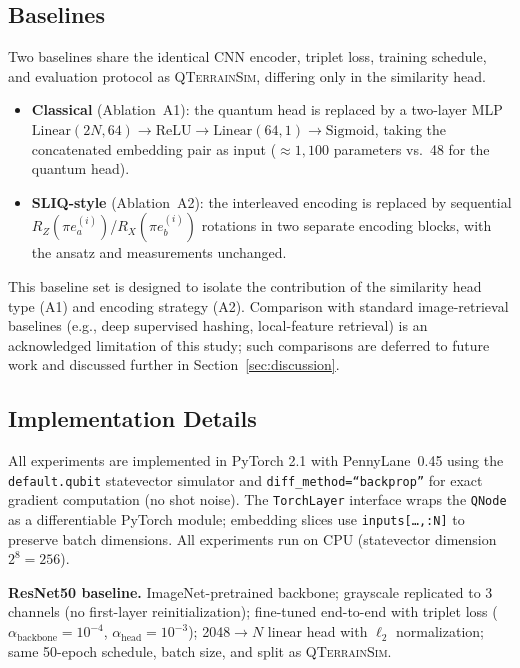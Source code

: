 \documentclass[conference,a4paper]{IEEEtran}
\newcommand{\qts}{\textsc{QTerrainSim}}
\newcommand{\RX}{R_X}
\newcommand{\RZ}{R_Z}
\begin{document}
\subsection{Baselines}
\label{sec:baselines}

Two baselines share the identical CNN encoder, triplet loss, training
schedule, and evaluation protocol as \qts{}, differing only in the
similarity head.

\begin{itemize}
\item \textbf{Classical} (Ablation~A1): the quantum head is replaced by
      a two-layer MLP
      $\mathrm{Linear}(2N,64)\to\mathrm{ReLU}\to\mathrm{Linear}(64,1)\to\mathrm{Sigmoid}$,
      taking the concatenated embedding pair as input
      (${\approx}1{,}100$ parameters vs.\ 48 for the quantum head).
\item \textbf{SLIQ-style} (Ablation~A2): the interleaved encoding is
      replaced by sequential $\RZ(\pi e_a^{(i)})$/$\RX(\pi e_b^{(i)})$
      rotations in two separate encoding blocks, with the ansatz and
      measurements unchanged.
\end{itemize}

This baseline set is designed to isolate the contribution of the
similarity head type (A1) and encoding strategy (A2).
Comparison with standard image-retrieval baselines (e.g., deep
supervised hashing, local-feature retrieval) is an acknowledged
limitation of this study; such comparisons are deferred to future work
and discussed further in Section~\ref{sec:discussion}.

\subsection{Implementation Details}
\label{sec:impl}

All experiments are implemented in PyTorch 2.1 with PennyLane~0.45
\cite{bergholm2018pennylane} using the \texttt{default.qubit} statevector
simulator and \texttt{diff\_method=``backprop''} for exact gradient
computation (no shot noise).
The \texttt{TorchLayer} interface wraps the \texttt{QNode} as a
differentiable PyTorch module; embedding slices use
\texttt{inputs[\ldots,:N]} to preserve batch dimensions.
All experiments run on CPU (statevector dimension $2^8{=}256$).

\textbf{ResNet50 baseline.}
ImageNet-pretrained backbone; grayscale replicated to 3 channels
(no first-layer reinitialization); fine-tuned end-to-end with triplet loss
($\alpha_{\text{backbone}}{=}10^{-4}$, $\alpha_{\text{head}}{=}10^{-3}$);
2048$\to N$ linear head with $\ell_2$ normalization; same 50-epoch schedule,
batch size, and split as \qts{}.
\end{document}
